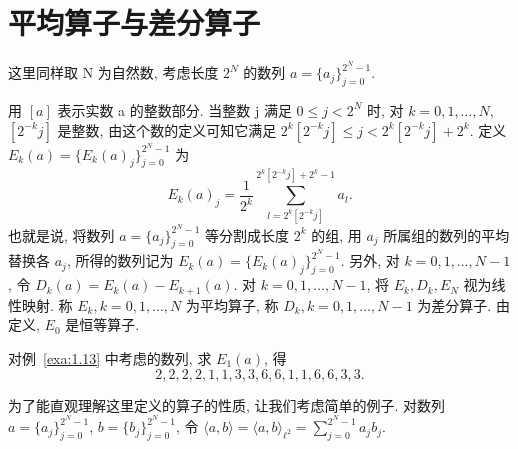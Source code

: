 
\section{平均算子与差分算子}\label{sec:1.7}













这里同样取 N 为自然数, 考虑长度 $2^{N}$ 的数列 $a = \{a_{j}\}_{j=0}^{2^{N}-1}$.

用 $[a]$ 表示实数 a 的整数部分. 当整数 j 满足 $0 \leq j < 2^{N}$ 时, 对 $k = 0, 1, \ldots, N$, $[2^{-k}j]$ 是整数, 由这个数的定义可知它满足 $2^{k}[2^{-k}j] \leq j < 2^{k}[2^{-k}j] + 2^{k}$. 定义 $E_{k}(a) = \{E_{k}(a)_{j}\}_{j=0}^{2^{N}-1}$ 为
\[
E_{k}(a)_{j} = \frac{1}{2^{k}}\sum_{l = 2^{k}[2^{-k}j]}^{2^{k}[2^{-k}j] + 2^{k} - 1}a_{l}.
\]
也就是说, 将数列 $a = \{a_{j}\}_{j=0}^{2^{N}-1}$ 等分割成长度 $2^{k}$ 的组, 用 $a_{j}$ 所属组的数列的平均替换各 $a_{j}$, 所得的数列记为 $E_{k}(a) = \{E_{k}(a)_{j}\}_{j=0}^{2^{N}-1}$. 另外, 对 $k = 0, 1, \ldots, N-1$, 令 $D_{k}(a) = E_{k}(a) - E_{k+1}(a)$. 对 $k = 0, 1, \ldots, N-1$, 将 $E_{k}, D_{k}, E_{N}$ 视为线性映射. 称 $E_{k}, k = 0, 1, \ldots, N$ 为平均算子, 称 $D_{k}, k = 0, 1, \ldots, N-1$ 为差分算子. 由定义, $E_{0}$ 是恒等算子.

\begin{example}\label{exa:1.14}
对例~\ref{exa:1.13} 中考虑的数列, 求 $E_{1}(a)$, 得
\[
2, 2, 2, 2, 1, 1, 3, 3, 6, 6, 1, 1, 6, 6, 3, 3.
\]
\end{example}

为了能直观理解这里定义的算子的性质, 让我们考虑简单的例子. 对数列 $a = \{a_{j}\}_{j=0}^{2^{N}-1}$, $b = \{b_{j}\}_{j=0}^{2^{N}-1}$, 令 $\langle a, b \rangle = \langle a, b \rangle_{\ell^{2}} = \sum_{j=0}^{2^{N}-1}a_{j}b_{j}$.


